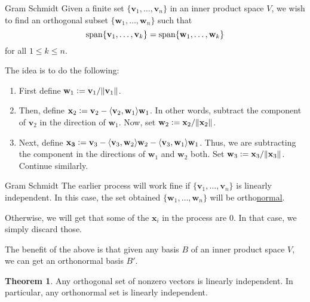 \documentclass[dvipsnames]{beamer}
\theoremstyle{definition}
\newtheorem{thm}{Theorem}
\let\le\leqslant
\begin{document}
\begin{frame}{Gram Schmidt}
    Given a finite set $\{\mathbf{v}_{1}, \ldots, \mathbf{v}_{n}\}$ in an inner product space $V$, \pause we wish to find an orthogonal subset $\{\mathbf{w}_{1}, \ldots, \mathbf{w}_{n}\}$ such that \pause
    \begin{equation*} 
        \operatorname{span}\{\mathbf{v}_{1}, \ldots, \mathbf{v}_{k}\} = \operatorname{span}\{\mathbf{w}_{1}, \ldots, \mathbf{w}_{k}\}
    \end{equation*}
    for all $1 \le k \le n$. \pause

    The idea is to do the following:  \pause
    \begin{enumerate}
        \item First define $\mathbf{w}_{1} \vcentcolon= \mathbf{v}_{1}/\|\mathbf{v}_{1}\|$. \pause
        \item Then, define $\mathbf{x}_{2} \vcentcolon= \mathbf{v}_{2} - \langle \mathbf{v}_{2}, \mathbf{w}_{1}\rangle \mathbf{w}_{1}$. \newline \pause
        In other words, subtract the component of $\mathbf{v}_{2}$ in the direction of $\mathbf{w}_{1}$. \newline \pause
        Now, set $\mathbf{w}_{2} \vcentcolon= \mathbf{x}_{2}/\|\mathbf{x}_{2}\|$. \pause
        \item Next, define $\mathbf{x_{3}} \vcentcolon= \mathbf{v}_{3} - \langle \mathbf{v}_{3}, \mathbf{w}_{2}\rangle \mathbf{w}_{2} - \langle \mathbf{v}_{3}, \mathbf{w}_{1}\rangle \mathbf{w}_{1}$. \newline \pause
        Thus, we are subtracting the component in the directions of $\mathbf{w}_{1}$ and $\mathbf{w}_{2}$ both. \newline \pause
        Set $\mathbf{w}_{3} \vcentcolon= \mathbf{x}_{3}/\|\mathbf{x}_{3}\|$. \newline
        Continue similarly.
    \end{enumerate}
\end{frame}
\begin{frame}{Gram Schmidt}
    The earlier process will work fine if $\{\mathbf{v}_{1}, \ldots, \mathbf{v}_{n}\}$ is linearly independent. \pause In this case, the set obtained $\{\mathbf{w}_{1}, \ldots, \mathbf{w}_{n}\}$ will be ortho\underline{normal}. \pause
    
    Otherwise, we will get that some of the $\mathbf{x}_{i}$ in the process are $0$. In that case, we simply discard those. \pause

    The benefit of the above is that given any basis $B$ of an inner product space $V$, we can get an orthonormal basis $B'$. \pause

    \begin{thm}
        Any orthogonal set of nonzero vectors is linearly independent. \pause \newline
        In particular, any orthonormal set is linearly independent.
    \end{thm}
\end{frame}
\end{document}

